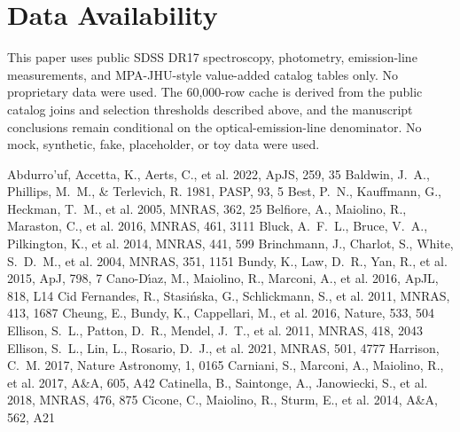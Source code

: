 \documentclass[twocolumn]{aastex631}
\begin{document}
\section*{Data Availability}
This paper uses public SDSS DR17 spectroscopy, photometry, emission-line measurements, and MPA-JHU-style value-added catalog tables only. No proprietary data were used. The 60,000-row cache is derived from the public catalog joins and selection thresholds described above, and the manuscript conclusions remain conditional on the optical-emission-line denominator. No mock, synthetic, fake, placeholder, or toy data were used.


\begin{thebibliography}{}
 Abdurro'uf, Accetta, K., Aerts, C., et al. 2022, ApJS, 259, 35
 Baldwin, J.~A., Phillips, M.~M., \& Terlevich, R. 1981, PASP, 93, 5
 Best, P.~N., Kauffmann, G., Heckman, T.~M., et al. 2005, MNRAS, 362, 25
 Belfiore, A., Maiolino, R., Maraston, C., et al. 2016, MNRAS, 461, 3111
 Bluck, A.~F.~L., Bruce, V.~A., Pilkington, K., et al. 2014, MNRAS, 441, 599
 Brinchmann, J., Charlot, S., White, S.~D.~M., et al. 2004, MNRAS, 351, 1151
 Bundy, K., Law, D.~R., Yan, R., et al. 2015, ApJ, 798, 7
 Cano-D\'{\i}az, M., Maiolino, R., Marconi, A., et al. 2016, ApJL, 818, L14
 Cid Fernandes, R., Stasi{\'n}ska, G., Schlickmann, S., et al. 2011, MNRAS, 413, 1687
 Cheung, E., Bundy, K., Cappellari, M., et al. 2016, Nature, 533, 504
 Ellison, S.~L., Patton, D.~R., Mendel, J.~T., et al. 2011, MNRAS, 418, 2043
 Ellison, S.~L., Lin, L., Rosario, D.~J., et al. 2021, MNRAS, 501, 4777
 Harrison, C.~M. 2017, Nature Astronomy, 1, 0165
 Carniani, S., Marconi, A., Maiolino, R., et al. 2017, A\&A, 605, A42
 Catinella, B., Saintonge, A., Janowiecki, S., et al. 2018, MNRAS, 476, 875
 Cicone, C., Maiolino, R., Sturm, E., et al. 2014, A\&A, 562, A21

\end{thebibliography}
\end{document}
